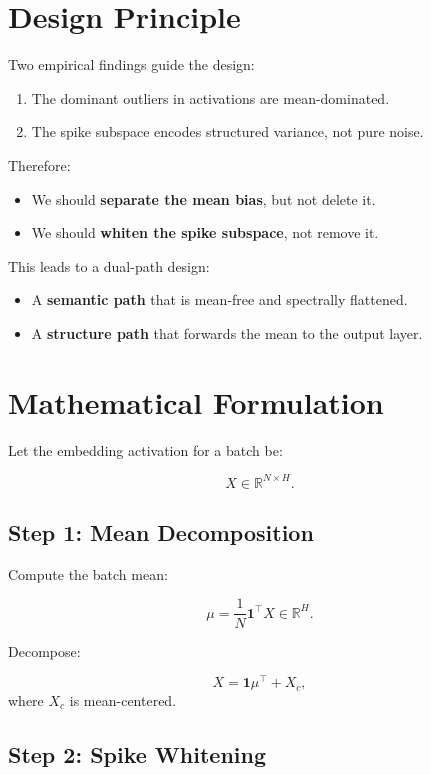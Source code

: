 \documentclass[11pt]{article}
\begin{document}
\section{Design Principle}

Two empirical findings guide the design:

\begin{enumerate}
    \item The dominant outliers in activations are mean-dominated.
    \item The spike subspace encodes structured variance, not pure noise.
\end{enumerate}

Therefore:

\begin{itemize}
    \item We should \textbf{separate the mean bias}, but not delete it.
    \item We should \textbf{whiten the spike subspace}, not remove it.
\end{itemize}

This leads to a dual-path design:

\begin{itemize}
    \item A \textbf{semantic path} that is mean-free and spectrally flattened.
    \item A \textbf{structure path} that forwards the mean to the output layer.
\end{itemize}

\section{Mathematical Formulation}

Let the embedding activation for a batch be:

\[
X \in \mathbb{R}^{N \times H}.
\]

\subsection{Step 1: Mean Decomposition}

Compute the batch mean:

\[
\mu = \frac{1}{N} \mathbf{1}^\top X \in \mathbb{R}^{H}.
\]

Decompose:

\[
X = \mathbf{1}\mu^\top + X_c,
\]
where $X_c$ is mean-centered.

\subsection{Step 2: Spike Whitening}
\end{document}
